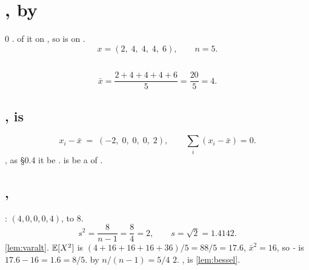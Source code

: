 \section{ ,  by }
\label{sec:worked}

 0   .     of it on  , so
  is  on .   
\[
x = (2,\;4,\;4,\;4,\;6),\qquad n=5 .
\]

\subsection{ }
\[
\bar x=\frac{2+4+4+4+6}{5}=\frac{20}{5}=4 .
\]

\subsection{,      is }
\[
x_i-\bar x \;=\; (-2,\;0,\;0,\;0,\;2),\qquad \sum_i (x_i-\bar x) = 0 .
\]
 , as §0.4  it  be  \emph{} .  is  
   be a  of .

\subsection{,  }
 : $(4,0,0,0,4)$,  to $8$.
\[
s^2=\frac{8}{n-1}=\frac{8}{4}=2,\qquad s=\sqrt{2}=1.4142 .
\]
  \cref{lem:varalt}. $\mathbb{E}[X^2]$    is
$(4+16+16+16+36)/5 = 88/5 = 17.6$,  $\bar x^2 = 16$, so 
\emph{-}  is $17.6-16=1.6 = 8/5$.  by
$n/(n-1)=5/4$  $2$.    ,      is
 \cref{lem:bessel}.

